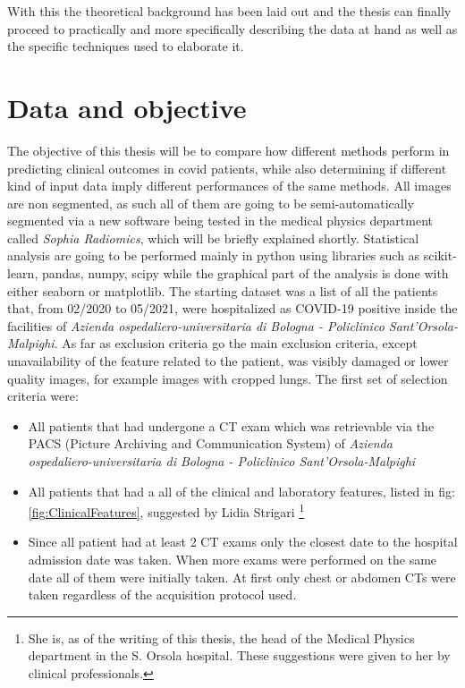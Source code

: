 With this the theoretical background has been laid out and the thesis can finally proceed to practically and more specifically describing the data at hand as well as the specific techniques used to elaborate it.


\section{Data and objective}
\label{chap:freefree}
The objective of this thesis will be to compare how different methods perform in predicting clinical outcomes in covid patients, while also determining if different kind of input data imply different performances of the same methods.
All images are non segmented, as such all of them are going to be semi-automatically segmented via a new software being tested in the medical physics department called \textit{Sophia Radiomics}, which will be briefly explained shortly. Statistical analysis are going to be performed mainly in python using libraries such as scikit-learn, pandas, numpy, scipy while the graphical part of the analysis is done with either seaborn or matplotlib. 
The starting dataset was a list of all the patients that, from 02/2020 to 05/2021, were hospitalized as COVID-19 positive inside the facilities of \textit{Azienda ospedaliero-universitaria di Bologna - Policlinico Sant'Orsola-Malpighi}. As far as exclusion criteria go the main exclusion criteria, except unavailability of the feature related to the patient, was visibly damaged or lower quality images, for example images with cropped lungs. The first set of selection criteria were:

\begin{itemize}
\item All patients that had undergone a CT exam which was retrievable via the PACS (Picture Archiving and Communication System) of \textit{Azienda ospedaliero-universitaria di Bologna - Policlinico Sant'Orsola-Malpighi}
\item All patients that had a all of the clinical and laboratory features, listed in fig:\ref{fig:ClinicalFeatures}, suggested by Lidia Strigari \footnote{She is, as of the writing of this thesis, the head of the Medical Physics department in the S. Orsola hospital. These suggestions were given to her by clinical professionals.}
\item Since all patient had at least 2 CT exams only the closest date to the hospital admission date was taken. When more exams were performed on the same date all of them were initially taken. At first only chest or abdomen CTs were taken regardless of the acquisition protocol used.
\end{itemize}


